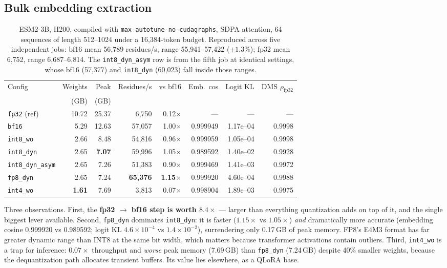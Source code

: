 \documentclass[11pt]{article}
\newcommand{\cfg}[1]{\texttt{#1}}
\newcommand{\best}[1]{\textbf{#1}}
\begin{document}
\subsection{Bulk embedding extraction}

\begin{table}[htb]
\centering
\caption{ESM2-3B, H200, compiled with \texttt{max-autotune-no-cudagraphs}, SDPA
attention, 64 sequences of length 512--1024 under a 16{,}384-token budget.
Reproduced across five independent jobs: bf16 mean 56{,}789 residues/s, range
55{,}941--57{,}422 ($\pm 1.3\%$); fp32 mean 6{,}752, range 6{,}687--6{,}814. The
\cfg{int8\_dyn\_asym} row is from the fifth job at identical settings, whose
bf16 (57{,}377) and \cfg{int8\_dyn} (60{,}023) fall inside those ranges.}
\small
\begin{tabular}{lrrrrrrr}
\toprule
Config & Weights & Peak & Residues/s & vs bf16 & Emb.\ cos & Logit KL & DMS $\rho_{\text{fp32}}$ \\
       & (GB)    & (GB) &            &         &           &          & \\
\midrule
\cfg{fp32} (ref)  & 10.72 & 25.37 &  6{,}750 & 0.12$\times$ & ---      & ---      & --- \\
\cfg{bf16}        &  5.29 & 12.63 & 57{,}057 & 1.00$\times$ & 0.999949 & 1.17e--04 & 0.9998 \\
\cfg{int8\_wo}    &  2.66 &  8.48 & 54{,}816 & 0.96$\times$ & 0.999959 & 1.05e--04 & 0.9998 \\
\cfg{int8\_dyn}   &  2.65 & \best{7.07} & 59{,}996 & 1.05$\times$ & 0.989592 & 1.40e--02 & 0.9928 \\
\cfg{int8\_dyn\_asym} & 2.65 &  7.26 & 51{,}383 & 0.90$\times$ & 0.999469 & 1.41e--03 & 0.9972 \\
\cfg{fp8\_dyn}    &  2.65 &  7.24 & \best{65{,}376} & \best{1.15$\times$} & 0.999920 & 4.60e--04 & 0.9988 \\
\cfg{int4\_wo}    & \best{1.61} &  7.69 &  3{,}813 & 0.07$\times$ & 0.998904 & 1.89e--03 & 0.9975 \\
\bottomrule
\end{tabular}
\end{table}

Three observations. First, the \textbf{fp32 $\to$ bf16 step is worth
$8.4\times$} --- larger than everything quantization adds on top of it, and the
single biggest lever available. Second, \cfg{fp8\_dyn} dominates
\cfg{int8\_dyn}: it is faster ($1.15\times$ vs $1.05\times$) \emph{and}
dramatically more accurate (embedding cosine 0.999920 vs 0.989592; logit KL
$4.6\times10^{-4}$ vs $1.4\times10^{-2}$), surrendering only 0.17\,GB of peak
memory. FP8's E4M3 format has far greater dynamic range than INT8 at the same
bit width, which matters because transformer activations contain outliers.
Third, \cfg{int4\_wo} is a trap for inference: $0.07\times$ throughput and
\emph{worse} peak memory (7.69\,GB) than \cfg{fp8\_dyn} (7.24\,GB) despite 40\%
smaller weights, because the dequantization path allocates transient buffers.
Its value lies elsewhere, as a QLoRA base.
\end{document}
